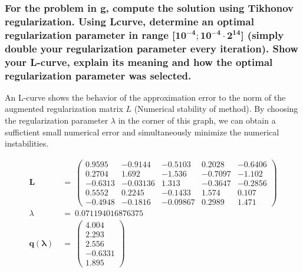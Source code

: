 \subsubsection{For the problem in g, compute the solution using Tikhonov regularization. Using Lcurve, determine an optimal regularization parameter in range [$\mathbf{10^{-4}; 10^{-4}\cdot2^{14}}$]
(simply double your regularization parameter every iteration). Show your L-curve,
explain its meaning and how the optimal regularization parameter was selected.}
An L-curve shows the behavior of the approximation error to the norm of the augmented regularization matrix $L$ (Numerical stability of method). By choosing the regularization parameter $\lambda$ in the corner of this graph, we can obtain a suffictient small numerical error and simultaneously minimize the numerical instabilities.

\begin{align}
\mathbf{L}\ &=\ \left(\begin{array}{ccccc} 0.9595 & -0.9144 & -0.5103 & 0.2028 & -0.6406\\ 0.2704 & 1.692 & -1.536 & -0.7097 & -1.102\\ -0.6313 & -0.03136 & 1.313 & -0.3647 & -0.2856\\ 0.5552 & 0.2245 & -0.1433 & 1.574 & 0.107\\ -0.4948 & -0.1816 & -0.09867 & 0.2989 & 1.471 \end{array}\right)\\
\lambda\ &=\ 0.071194016876375\\
\mathbf{q(\lambda)}\ &=\ \left(\begin{array}{c} 4.004\\ 2.293\\ 2.556\\ -0.6331\\ 1.895 \end{array}\right)
\end{align}

